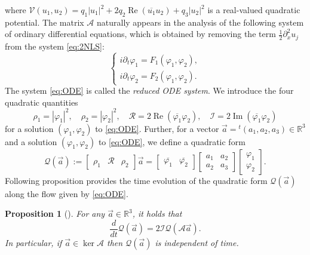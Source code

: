 \documentclass[11pt,a4paper,twosides]{amsart}
\theoremstyle{plain}
\newtheorem{proposition}[theorem]{Proposition}
\theoremstyle{remark}
\numberwithin{equation}{section}
\newcommand{\R}{\mathbb{R}}
\renewcommand{\Im}{\operatorname{Im}}
\renewcommand{\Re}{\operatorname{Re}}
\theoremstyle{definition}
\newcommand{\1}{{\bf 1}_{\{|x| < |t|\}}}
\renewcommand{\phi}{\varphi}
\begin{document}
where $\mathcal{V}(u_1,u_2)=q_1 |u_1|^2 + 2q_2 \Re (\overline{u_1}u_2)  + q_3 |u_2|^2$ is a real-valued quadratic potential.
The matrix $\mathscr{A}$ naturally appears in the analysis of the following system of ordinary differential equations, which is obtained 
 by removing the term $\frac12\partial_x^2u_j$ from the system \eqref{eq:2NLS}:
\begin{equation}\label{eq:ODE}
  \left\{
  \begin{aligned}
    i\partial_t \phi_1 = F_1(\phi_1, \phi_2), \\
    i\partial_t \phi_2 = F_2(\phi_1, \phi_2).
  \end{aligned}
  \right.
\end{equation}
The system \eqref{eq:ODE} is called the \textit{reduced ODE system}. We introduce the four quadratic quantities 
\begin{equation}\label{eq:rhoq}
  \rho_1 = |\phi_1|^2,\quad \rho_2=|\phi_2|^2,\quad  \mathcal{R} = 2\Re(\overline{\phi_1}\phi_2),\quad  \mathcal{I}=2\Im(\overline{\phi_1}\phi_2)
\end{equation}
for a solution $(\varphi_1,\varphi_2)$ to \eqref{eq:ODE}. 
Further, for a vector $\vec{a}={}^t\!(a_1,a_2,a_3)\in\R^3$ and a solution $(\varphi_1,\varphi_2)$ to \eqref{eq:ODE}, we define a quadratic form
\begin{equation}\label{eq:Q}
	\mathcal{Q}(\vec a) := \begin{bmatrix}
      \rho_1 & \mathcal{R} & \rho_2
    \end{bmatrix} \vec{a}= \begin{bmatrix}
    \overline{\varphi_1} &
    \overline{\varphi_2}
    \end{bmatrix}
    \begin{bmatrix}
      a_1 & a_2 \\ a_2 & a_3
    \end{bmatrix}
   \begin{bmatrix}
   \varphi_1 \\ \varphi_2
	\end{bmatrix}.
\end{equation}
Following proposition provides the time evolution of the 
quadratic form $\mathcal{Q}(\vec{a})$ along the flow given by \eqref{eq:ODE}.
\begin{proposition}[\cite{MaSeUr2}] \label{prop:ode}
  For any $\vec{a}\in \R^3$, it holds that
  \begin{equation}
    \frac{d}{dt} \mathcal{Q}(\vec{a})
    = 2\mathcal{I} \mathcal{Q}(\mathscr{A}\vec{a}).
  \end{equation}
  In particular, if $\vec{a} \in \ker \mathscr{A}$ then $\mathcal{Q}(\vec{a})$ is independent of time.
\end{proposition}
\end{document}
